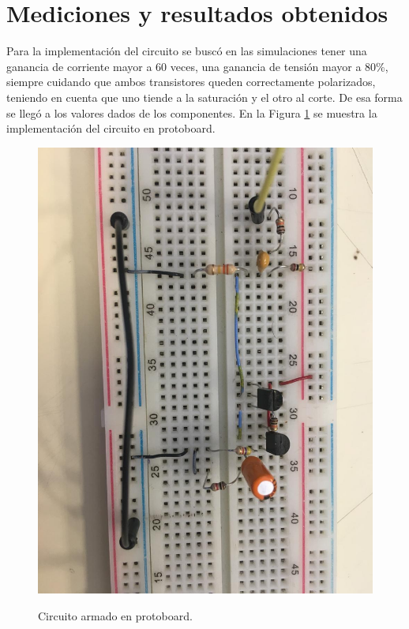 \section{Mediciones y resultados obtenidos}

Para la implementación del circuito se buscó en las simulaciones tener una ganancia de corriente mayor a 60 veces, una ganancia de tensión mayor a 80\%, siempre cuidando que ambos transistores queden correctamente polarizados, teniendo en cuenta que uno tiende a la saturación y el otro al corte. De esa forma se llegó a los valores dados de los componentes. En la Figura \ref{circ_proto} se muestra la implementación del circuito en protoboard.

		\begin{figure}[H]
			\centering
			\includegraphics[scale=0.4]{./Imagenes/circuito_proto.jpeg} \\
			\caption{Circuito armado en protoboard.}
			\label{circ_proto}
		\end{figure}

